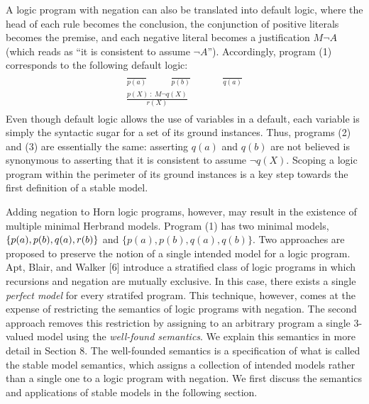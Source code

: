 A logic program with negation can also be translated into default logic, where the head 
of each rule becomes the conclusion, the conjunction of positive literals becomes the premise, 
and each negative literal becomes a justification $M \neg A$ (which reads as ``it is consistent to assume $\neg A$''). 
Accordingly, program (1) corresponds to the following default logic:
\begin{align}
    \begin{split}
        \frac{}{p(a)} \hspace{1cm} \frac{}{p(b)} \hspace{1cm} &\frac{}{q(a)} \\ 
        \frac{p(X) \: : \: M \neg q(X)}{r(X)}&
    \end{split}
\end{align}
Even though default logic allows the use of variables in a default, each variable is simply 
the syntactic sugar for a set of its ground instances. Thus, programs (2) and (3) are essentially 
the same: asserting $q(a)$ and $q(b)$ are not believed is synonymous to asserting that it is consistent to assume 
$\neg q(X)$. Scoping a logic program within the perimeter of its ground instances is a key step 
towards the first definition of a stable model. 

Adding negation to Horn logic programs, however, may result in the existence of multiple minimal Herbrand models. 
Program (1) has two minimal models, $\{p(a),p(b),q(a),\\r(b)\}$ and $\{p(a),p(b),q(a),q(b)\}$.
Two approaches are proposed to preserve the notion of a single intended model for a logic program. 
Apt, Blair, and Walker [6] introduce a stratified class of logic programs in which recursions and negation are 
mutually exclusive. In this case, there exists a single \emph{perfect model} for every stratifed program. 
This technique, however, comes at the expense of restricting the semantics of logic programs with negation. 
The second approach removes this restriction by assigning to an arbitrary program a single 3-valued 
model using the \emph{well-found semantics}. We explain this semantics in more detail in Section 8. The 
well-founded semantics is a specification of what is called the stable model semantics, which 
assigns a collection of intended models rather than a single one to a logic program with negation. 
We first discuss the semantics and applications of stable models in the following section. 